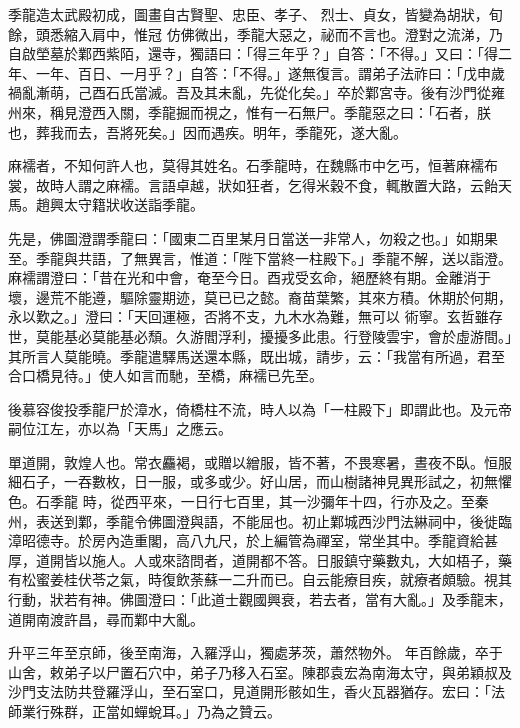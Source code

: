 \begin{pinyinscope}
季龍造太武殿初成，圖畫自古賢聖、忠臣、孝子、
 烈士、貞女，皆變為胡狀，旬餘，頭悉縮入肩中，惟冠
 仿佛微出，季龍大惡之，祕而不言也。澄對之流涕，乃自啟塋墓於鄴西紫陌，還寺，獨語曰：「得三年乎？」自答：「不得。」又曰：「得二年、一年、百日、一月乎？」自答：「不得。」遂無復言。謂弟子法祚曰：「戊申歲禍亂漸萌，己酉石氏當滅。吾及其未亂，先從化矣。」卒於鄴宮寺。後有沙門從雍州來，稱見澄西入關，季龍掘而視之，惟有一石無尸。季龍惡之曰：「石者，朕也，葬我而去，吾將死矣。」因而遇疾。明年，季龍死，遂大亂。



 麻襦者，不知何許人也，莫得其姓名。石季龍時，在魏縣市中乞丐，恒著麻襦布裳，故時人謂之麻襦。言語卓越，狀如狂者，乞得米穀不食，輒散置大路，云飴天馬。趙興太守籍狀收送詣季龍。



 先是，佛圖澄謂季龍曰：「國東二百里某月日當送一非常人，勿殺之也。」如期果至。季龍與共語，了無異言，惟道：「陛下當終一柱殿下。」季龍不解，送以詣澄。麻襦謂澄曰：「昔在光和中會，奄至今日。酉戎受玄命，絕歷終有期。金離消于壞，邊荒不能遵，驅除靈期迹，莫已已之懿。裔苗葉繁，其來方積。休期於何期，永以歎之。」澄曰：「天回運極，否將不支，九木水為難，無可以
 術寧。玄哲雖存世，莫能基必莫能基必頹。久游閻浮利，擾擾多此患。行登陵雲宇，會於虛游間。」其所言人莫能曉。季龍遣驛馬送還本縣，既出城，請步，云：「我當有所過，君至合口橋見待。」使人如言而馳，至橋，麻襦已先至。



 後慕容俊投季龍尸於漳水，倚橋柱不流，時人以為「一柱殿下」即謂此也。及元帝嗣位江左，亦以為「天馬」之應云。



 單道開，敦煌人也。常衣麤褐，或贈以繒服，皆不著，不畏寒暑，晝夜不臥。恒服細石子，一吞數枚，日一服，或多或少。好山居，而山樹諸神見異形試之，初無懼色。石季龍
 時，從西平來，一日行七百里，其一沙彌年十四，行亦及之。至秦州，表送到鄴，季龍令佛圖澄與語，不能屈也。初止鄴城西沙門法綝祠中，後徙臨漳昭德寺。於房內造重閣，高八九尺，於上編管為禪室，常坐其中。季龍資給甚厚，道開皆以施人。人或來諮問者，道開都不答。日服鎮守藥數丸，大如梧子，藥有松蜜姜桂伏苓之氣，時復飲荼蘇一二升而已。自云能療目疾，就療者頗驗。視其行動，狀若有神。佛圖澄曰：「此道士觀國興衰，若去者，當有大亂。」及季龍末，道開南渡許昌，尋而鄴中大亂。



 升平三年至京師，後至南海，入羅浮山，獨處茅茨，蕭然物外。
 年百餘歲，卒于山舍，敕弟子以尸置石穴中，弟子乃移入石室。陳郡袁宏為南海太守，與弟穎叔及沙門支法防共登羅浮山，至石室口，見道開形骸如生，香火瓦器猶存。宏曰：「法師業行殊群，正當如蟬蛻耳。」乃為之贊云。




\end{pinyinscope}
